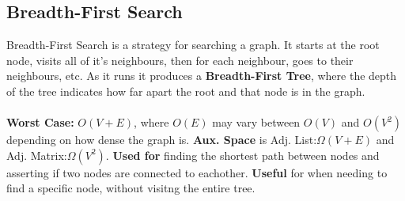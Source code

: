\documentclass{article}
\begin{document}

	\subsection{Breadth-First Search}
	Breadth-First Search is a strategy for searching a graph. It starts at the root node, visits all of it's neighbours, then for each neighbour, goes to their neighbours, etc. As it runs it produces a {\bf Breadth-First Tree}, where the depth of the tree indicates how far apart the root and that node is in the graph.
	\\ \\
	{\bf Worst Case:} $O(V + E)$, where $O(E)$ may vary between $O(V)$ and $O(V^2)$ depending on how dense the graph is. {\bf Aux. Space} is Adj. List:$\Omega(V + E)$ and Adj. Matrix:$\Omega(V^2)$. {\bf Used for} finding the shortest path between nodes and asserting if two nodes are connected to eachother. {\bf Useful} for when needing to find a specific node, without visitng the entire tree.
\end{document}
